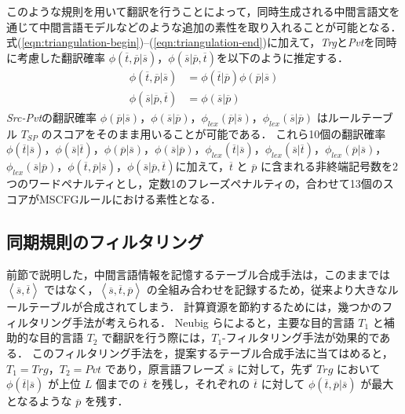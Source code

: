 \documentclass[japanese]{jnlp_1.4}
\begin{document}
このような規則を用いて翻訳を行うことによって，同時生成される中間言語文を通じて中間言語モデルなどのような追加の素性を取り入れることが可能となる．
式(\ref{eqn:triangulation-begin})--(\ref{eqn:triangulation-end})に加えて，\textit{Trg}と\textit{Pvt}を同時に考慮した翻訳確率 $\phi\left(\overline{t},\overline{p}|\overline{s}\right)$，$\phi\left(\overline{s}|\overline{p},\overline{t}\right)$を以下のように推定する．
\begin{align}
\phi\left(\overline{t},\overline{p}|\overline{s}\right) & = \phi\left(\overline{t}|\overline{p}\right) \phi\left(\overline{p}|\overline{s}\right) \\
\phi\left(\overline{s}|\overline{p},\overline{t}\right) & = \phi\left(\overline{s}|\overline{p}\right)
\end{align}
\textit{Src-Pvt}の翻訳確率 $\phi\left(\overline{p}|\overline{s}\right)$，$\phi\left(\overline{s}|\overline{p}\right)$，$\phi_{lex}\left(\overline{p}|\overline{s}\right)$，$\phi_{lex}\left(\overline{s}|\overline{p}\right)$ はルールテーブル $T_{SP}$ のスコアをそのまま用いることが可能である．
これら10個の翻訳確率 $\phi\left(\overline{t}|\overline{s}\right)$，$\phi\left(\overline{s}|\overline{t}\right)$，$\phi\left(\overline{p}|\overline{s}\right)$，$\phi\left(\overline{s}|\overline{p}\right)$，$\phi_{lex}\left(\overline{t}|\overline{s}\right)$，$\phi_{lex}\left(\overline{s}|\overline{t}\right)$，$\phi_{lex}\left(\overline{p}|\overline{s}\right)$，$\phi_{lex}\left(\overline{s}|\overline{p}\right)$，$\phi\left(\overline{t},\overline{p}|\overline{s}\right)$，$\phi\left(\overline{s}|\overline{p},\overline{t}\right)$に加えて，$\overline{t}$ と $\overline{p}$ に含まれる非終端記号数を2つのワードペナルティとし，定数1のフレーズペナルティの，合わせて13個のスコアがMSCFGルールにおける素性となる．


\subsection{同期規則のフィルタリング}

前節で説明した，中間言語情報を記憶するテーブル合成手法は，このままでは $\left<\overline{s},\overline{t}\right>$ ではなく，$\left<\overline{s},\overline{t},\overline{p}\right>$ の全組み合わせを記録するため，従来より大きなルールテーブルが合成されてしまう．
計算資源を節約するためには，幾つかのフィルタリング手法が考えられる．
Neubig らによると，主要な目的言語 $T_1$ と補助的な目的言語 $T_2$ で翻訳を行う際には，$T_1$-フィルタリング手法\cite{neubig15naacl}が効果的である．
このフィルタリング手法を，提案するテーブル合成手法に当てはめると， $T_1 = Trg$，$T_2 = Pvt$ であり，原言語フレーズ $\overline{s}$ に対して，先ず $Trg$ において $\phi\left(\overline{t}|\overline{s}\right)$ が上位 $L$ 個までの $\overline{t}$ を残し，それぞれの $\overline{t}$ に対して $\phi\left(\overline{t},\overline{p}|\overline{s}\right)$ が最大となるような $\overline{p}$ を残す．
\end{document}
